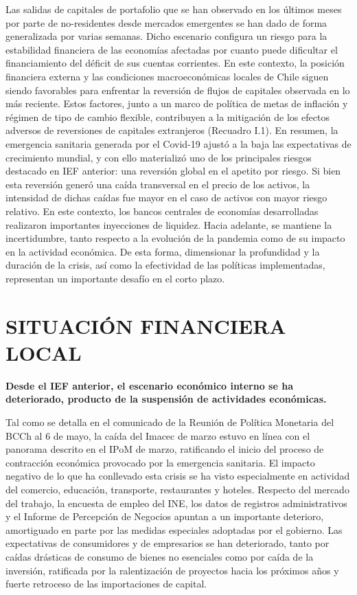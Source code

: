\documentclass[
]{book}
\begin{document}
Las salidas de capitales de portafolio que se han observado en los últimos
meses por parte de no-residentes desde mercados emergentes se han dado
de forma generalizada por varias semanas. Dicho escenario configura un
riesgo para la estabilidad financiera de las economías afectadas por cuanto
puede dificultar el financiamiento del déficit de sus cuentas corrientes. En este
contexto, la posición financiera externa y las condiciones macroeconómicas
locales de Chile siguen siendo favorables para enfrentar la reversión de flujos
de capitales observada en lo más reciente. Estos factores, junto a un marco de
política de metas de inflación y régimen de tipo de cambio flexible, contribuyen
a la mitigación de los efectos adversos de reversiones de capitales extranjeros
(Recuadro I.1).
En resumen, la emergencia sanitaria generada por el Covid-19 ajustó a la
baja las expectativas de crecimiento mundial, y con ello materializó uno de los
principales riesgos destacado en IEF anterior: una reversión global en el apetito
por riesgo. Si bien esta reversión generó una caída transversal en el precio
de los activos, la intensidad de dichas caídas fue mayor en el caso de activos
con mayor riesgo relativo. En este contexto, los bancos centrales de economías
desarrolladas realizaron importantes inyecciones de liquidez. Hacia adelante,
se mantiene la incertidumbre, tanto respecto a la evolución de la pandemia
como de su impacto en la actividad económica. De esta forma, dimensionar la
profundidad y la duración de la crisis, así como la efectividad de las políticas
implementadas, representan un importante desafío en el corto plazo.

\hypertarget{SFL}{%
\section*{SITUACIÓN FINANCIERA LOCAL}\label{SFL}}

\textbf{Desde el IEF anterior, el escenario económico interno se ha deteriorado, producto de la suspensión de actividades económicas.}

Tal como se detalla en el comunicado de la Reunión de Política Monetaria del
BCCh al 6 de mayo, la caída del Imacec de marzo estuvo en línea con el panorama
descrito en el IPoM de marzo, ratificando el inicio del proceso de contracción
económica provocado por la emergencia sanitaria. El impacto negativo de
lo que ha conllevado esta crisis se ha visto especialmente en actividad del
comercio, educación, transporte, restaurantes y hoteles. Respecto del mercado
del trabajo, la encuesta de empleo del INE, los datos de registros administrativos
y el Informe de Percepción de Negocios apuntan a un importante deterioro,
amortiguado en parte por las medidas especiales adoptadas por el gobierno.
Las expectativas de consumidores y de empresarios se han deteriorado, tanto
por caídas drásticas de consumo de bienes no esenciales como por caída de la
inversión, ratificada por la ralentización de proyectos hacia los próximos años y
fuerte retroceso de las importaciones de capital.
\end{document}
